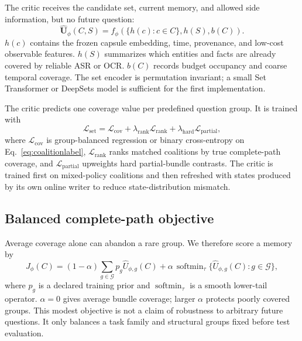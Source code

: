 \documentclass[10pt,twocolumn,letterpaper]{article}
\newcommand{\softmin}{\operatorname{softmin}}
\begin{document}
The critic receives the candidate set, current memory, and allowed side information, but no future question:
\begin{equation}
    \widehat{\mathbf U}_\phi(C,S)=f_\phi\!\left(\{h(c):c\in C\},h(S),b(C)\right).
    \label{eq:critic}
\end{equation}
$h(c)$ contains the frozen capsule embedding, time, provenance, and low-cost observable features.
$h(S)$ summarizes which entities and facts are already covered by reliable ASR or OCR.
$b(C)$ records budget occupancy and coarse temporal coverage.
The set encoder is permutation invariant; a small Set Transformer or DeepSets model is sufficient for the first implementation.

The critic predicts one coverage value per predefined question group.
It is trained with
\begin{equation}
\mathcal L_{\mathrm{set}}=
\mathcal L_{\mathrm{cov}}
+\lambda_{\mathrm{rank}}\mathcal L_{\mathrm{rank}}
+\lambda_{\mathrm{hard}}\mathcal L_{\mathrm{partial}},
\label{eq:loss}
\end{equation}
where $\mathcal L_{\mathrm{cov}}$ is group-balanced regression or binary cross-entropy on Eq.~\eqref{eq:coalitionlabel}, $\mathcal L_{\mathrm{rank}}$ ranks matched coalitions by true complete-path coverage, and $\mathcal L_{\mathrm{partial}}$ upweights hard partial-bundle contrasts.
The critic is trained first on mixed-policy coalitions and then refreshed with states produced by its own online writer to reduce state-distribution mismatch.

\subsection{Balanced complete-path objective}

Average coverage alone can abandon a rare group.
We therefore score a memory by
\begin{equation}
    J_\phi(C)=
    (1-\alpha)\sum_{g\in\mathcal G}p_g\widehat U_{\phi,g}(C)
    +\alpha\,\softmin_{\tau}\{\widehat U_{\phi,g}(C):g\in\mathcal G\},
    \label{eq:balanced}
\end{equation}
where $p_g$ is a declared training prior and $\softmin_\tau$ is a smooth lower-tail operator.
$\alpha=0$ gives average bundle coverage; larger $\alpha$ protects poorly covered groups.
This modest objective is not a claim of robustness to arbitrary future questions.
It only balances a task family and structural groups fixed before test evaluation.
\end{document}
